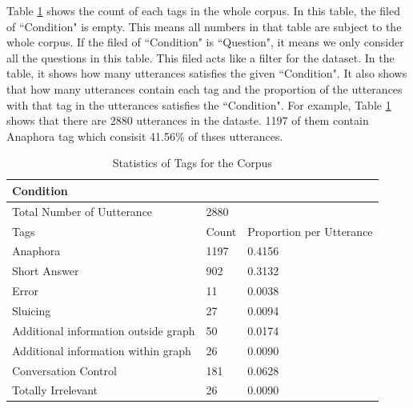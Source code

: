 \documentclass[bsc,frontabs,twoside,singlespacing,parskip,deptreport]{infthesis}     %
\begin{document}
Table \ref{tab:ori} shows the count of each tags in the whole corpus. In this table, the filed of ``Condition" is empty. This means all numbers in that table are subject to the whole corpus. If the filed of ``Condition" is ``Question", it means we only consider all the questions in this table. This filed acts like a filter for the dataset. In the table, it shows how many utterances satisfies the given ``Condition". It also shows that how many utterances contain each tag and the proportion of the utterances with that tag in the utterances satisfies the ``Condition". For example, Table \ref{tab:ori} shows that there are 2880 utterances in the dataste. 1197 of them contain Anaphora tag which consisit 41.56\% of thses utterances.

\begin{table}[]
\centering
\begin{tabular}{|l|l|l|}
\hline
Condition                            & \multicolumn{2}{l|}{}            \\ \hline
Total Number of Uutterance           & \multicolumn{2}{l|}{2880}        \\ \hline
Tags                                 & Count & Proportion per Utterance \\ \hline
Anaphora                             & 1197  & 0.4156                   \\ \hline
Short Answer                         & 902   & 0.3132                   \\ \hline
Error                                & 11    & 0.0038                   \\ \hline
Sluicing                             & 27    & 0.0094                   \\ \hline
Additional information outside graph & 50    & 0.0174                   \\ \hline
Additional information within graph  & 26    & 0.0090                   \\ \hline
Conversation Control                 & 181   & 0.0628                   \\ \hline
Totally Irrelevant                   & 26    & 0.0090                   \\ \hline
\end{tabular}
\caption{Statistics of Tags for the Corpus }
\label{tab:ori}
\end{table}
\end{document}
